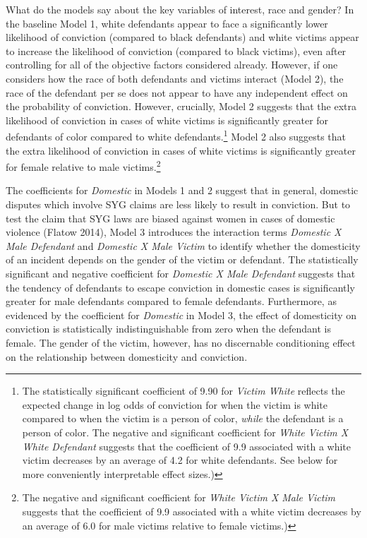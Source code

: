 \documentclass[12pt,article]{article}
\begin{document}
What do the models say about the key variables of interest, race and
gender? In the baseline Model 1, white defendants appear to face a
significantly lower likelihood of conviction (compared to black
defendants) and white victims appear to increase the likelihood of
conviction (compared to black victims), even after controlling for all
of the objective factors considered already. However, if one considers
how the race of both defendants and victims interact (Model 2), the race
of the defendant per se does not appear to have any independent effect
on the probability of conviction. However, crucially, Model 2 suggests
that the extra likelihood of conviction in cases of white victims is
significantly greater for defendants of color compared to white
defendants.\footnote{The statistically significant coefficient of 9.90
  for \emph{Victim White} reflects the expected change in log odds of
  conviction for when the victim is white compared to when the victim is
  a person of color, \emph{while} the defendant is a person of color.
  The negative and significant coefficient for \emph{White Victim X
  White Defendant} suggests that the coefficient of 9.9 associated with
  a white victim decreases by an average of 4.2 for white defendants.
  See below for more conveniently interpretable effect sizes.)} Model 2
also suggests that the extra likelihood of conviction in cases of white
victims is significantly greater for female relative to male
victims.\footnote{The negative and significant coefficient for
  \emph{White Victim X Male Victim} suggests that the coefficient of 9.9
  associated with a white victim decreases by an average of 6.0 for male
  victims relative to female victims.)}

The coefficients for \emph{Domestic} in Models 1 and 2 suggest that in
general, domestic disputes which involve SYG claims are less likely to
result in conviction. But to test the claim that SYG laws are biased
against women in cases of domestic violence (Flatow 2014), Model 3
introduces the interaction terms \emph{Domestic X Male Defendant} and
\emph{Domestic X Male Victim} to identify whether the domesticity of an
incident depends on the gender of the victim or defendant. The
statistically significant and negative coefficient for \emph{Domestic X
Male Defendant} suggests that the tendency of defendants to escape
conviction in domestic cases is significantly greater for male
defendants compared to female defendants. Furthermore, as evidenced by
the coefficient for \emph{Domestic} in Model 3, the effect of
domesticity on conviction is statistically indistinguishable from zero
when the defendant is female. The gender of the victim, however, has no
discernable conditioning effect on the relationship between domesticity
and conviction.
\end{document}
